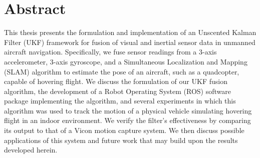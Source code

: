 \chapter*{Abstract}


This thesis presents the formulation and implementation of an Unscented Kalman Filter (UKF) framework for fusion of visual and inertial sensor data in unmanned aircraft navigation. Specifically, we fuse sensor readings from a 3-axis accelerometer, 3-axis gyroscope, and a Simultaneous Localization and Mapping (SLAM) algorithm to estimate the pose of an aircraft, such as a quadcopter, capable of hovering flight. We discuss the formulation of our UKF fusion algorithm, the development of a Robot Operating System (ROS) software package implementing the algorithm, and several experiments in which this algorithm was used to track the motion of a physical vehicle simulating hovering flight in an indoor environment. We verify the filter's effectiveness by comparing its output to that of a Vicon motion capture system. We then discuss possible applications of this system and future work that may build upon the results developed herein.